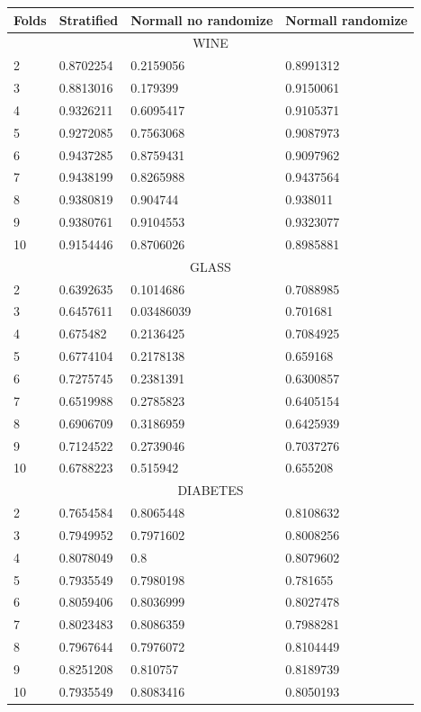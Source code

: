 \documentclass[12pt,a4paper]{article}
\begin{document}
\begin{tabular}{ |p{2.3cm}||p{2.5cm}|p{3.5cm}|p{3.5cm}| }
 \hline
Folds&Stratified&Normall no randomize&Normall randomize\\
\hline
\multicolumn{4}{|c|}{WINE}\\
\hline
2 &0.8702254 &0.2159056 &0.8991312\\
3 &0.8813016 &0.179399 &0.9150061\\
4 &0.9326211 &0.6095417 &0.9105371\\
5 &0.9272085 &0.7563068 &0.9087973\\
6 &0.9437285 &0.8759431 &0.9097962\\
7 &0.9438199 &0.8265988 &0.9437564\\
8 &0.9380819 &0.904744 &0.938011\\
9 &0.9380761 &0.9104553 &0.9323077\\
10 &0.9154446 &0.8706026 &0.8985881\\
\hline
\multicolumn{4}{|c|}{GLASS}\\
\hline
2 &0.6392635 &0.1014686 &0.7088985\\
3 &0.6457611 &0.03486039 &0.701681\\
4 &0.675482 &0.2136425 &0.7084925\\
5 &0.6774104 &0.2178138 &0.659168\\
6 &0.7275745 &0.2381391 &0.6300857\\
7 &0.6519988 &0.2785823 &0.6405154\\
8 &0.6906709 &0.3186959 &0.6425939\\
9 &0.7124522 &0.2739046 &0.7037276\\
10 &0.6788223 &0.515942 &0.655208\\
\hline
\multicolumn{4}{|c|}{DIABETES}\\
\hline
2 &0.7654584 &0.8065448 &0.8108632\\
3 &0.7949952 &0.7971602 &0.8008256\\
4 &0.8078049 &0.8 &0.8079602\\
5 &0.7935549 &0.7980198 &0.781655\\
6 &0.8059406 &0.8036999 &0.8027478\\
7 &0.8023483 &0.8086359 &0.7988281\\
8 &0.7967644 &0.7976072 &0.8104449\\
9 &0.8251208 &0.810757 &0.8189739\\
10 &0.7935549 &0.8083416 &0.8050193\\
\hline
\end{tabular}
\vspace{5mm}
\vspace{5mm}
\end{document}
